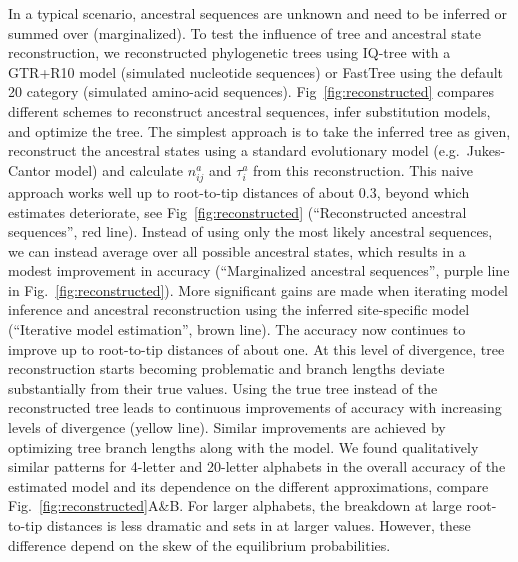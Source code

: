 \documentclass[aps,rmp,twocolumn,linenumbers]{revtex4-1}
\begin{document}
In a typical scenario, ancestral sequences are unknown and need to be inferred or summed over (marginalized).
To test the influence of tree and ancestral state reconstruction, we reconstructed phylogenetic trees using IQ-tree \citep{nguyen_iq-tree:_2015} with a GTR+R10 model (simulated nucleotide sequences) or FastTree \citep{FastTree} using the default 20 category (simulated amino-acid sequences).
Fig~\ref{fig:reconstructed} compares different schemes to reconstruct ancestral sequences, infer substitution models, and optimize the tree.
The simplest approach is to take the inferred tree as given, reconstruct the ancestral states using a standard evolutionary model (e.g.~Jukes-Cantor model) and calculate $n^a_{ij}$ and $\tau_i^a$ from this reconstruction.
This naive approach works well up to root-to-tip distances of about 0.3, beyond which estimates deteriorate, see Fig~\ref{fig:reconstructed} (``Reconstructed ancestral sequences'', red line).
Instead of using only the most likely ancestral sequences, we can instead average over all possible ancestral states, which results in a modest improvement in accuracy (``Marginalized ancestral sequences'', purple line in Fig.~\ref{fig:reconstructed}).
More significant gains are made when iterating model inference and ancestral reconstruction using the inferred site-specific model (``Iterative model estimation'', brown line).
The accuracy now continues to improve up to root-to-tip distances of about one.
At this level of divergence, tree reconstruction starts becoming problematic and branch lengths deviate substantially from their true values.
Using the true tree instead of the reconstructed tree leads to continuous improvements of accuracy with increasing levels of divergence (yellow line).
Similar improvements are achieved by optimizing tree branch lengths along with the model.
We found qualitatively similar patterns for 4-letter and 20-letter alphabets in the overall accuracy of the estimated model and its dependence on the different approximations, compare Fig.~\ref{fig:reconstructed}A\&B.
For larger alphabets, the breakdown at large root-to-tip distances is less dramatic and sets in at larger values.
However, these difference depend on the skew of the equilibrium probabilities.
\end{document}
